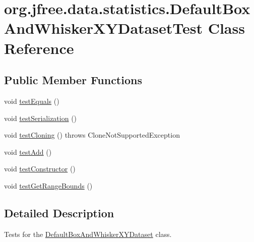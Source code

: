 \hypertarget{classorg_1_1jfree_1_1data_1_1statistics_1_1_default_box_and_whisker_x_y_dataset_test}{}\section{org.\+jfree.\+data.\+statistics.\+Default\+Box\+And\+Whisker\+X\+Y\+Dataset\+Test Class Reference}
\label{classorg_1_1jfree_1_1data_1_1statistics_1_1_default_box_and_whisker_x_y_dataset_test}
\subsection*{Public Member Functions}
\begin{DoxyCompactItemize}
\item 
void \mbox{\hyperlink{classorg_1_1jfree_1_1data_1_1statistics_1_1_default_box_and_whisker_x_y_dataset_test_a1c76134158d6aae88a7b158b4558576e}{test\+Equals}} ()
\item 
void \mbox{\hyperlink{classorg_1_1jfree_1_1data_1_1statistics_1_1_default_box_and_whisker_x_y_dataset_test_adc3fe8821453eba4df727be4b3d0ff71}{test\+Serialization}} ()
\item 
void \mbox{\hyperlink{classorg_1_1jfree_1_1data_1_1statistics_1_1_default_box_and_whisker_x_y_dataset_test_a434873696948a843c5d99e811fd81bc9}{test\+Cloning}} ()  throws Clone\+Not\+Supported\+Exception 
\item 
void \mbox{\hyperlink{classorg_1_1jfree_1_1data_1_1statistics_1_1_default_box_and_whisker_x_y_dataset_test_a7aa7c3a99fb52df81aadb8bbb55e75b6}{test\+Add}} ()
\item 
void \mbox{\hyperlink{classorg_1_1jfree_1_1data_1_1statistics_1_1_default_box_and_whisker_x_y_dataset_test_a2ebb3f5c70dd40151197248509349efc}{test\+Constructor}} ()
\item 
void \mbox{\hyperlink{classorg_1_1jfree_1_1data_1_1statistics_1_1_default_box_and_whisker_x_y_dataset_test_a59178bf8a3d290b449b94310dfe0bae4}{test\+Get\+Range\+Bounds}} ()
\end{DoxyCompactItemize}


\subsection{Detailed Description}
Tests for the \mbox{\hyperlink{classorg_1_1jfree_1_1data_1_1statistics_1_1_default_box_and_whisker_x_y_dataset}{Default\+Box\+And\+Whisker\+X\+Y\+Dataset}} class. 

